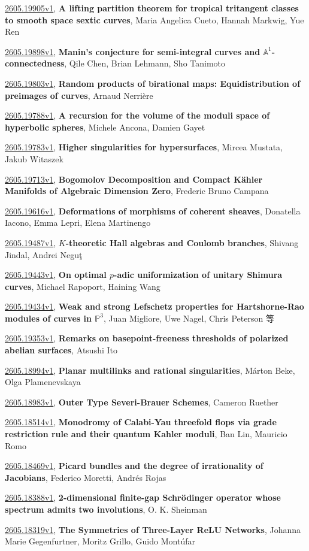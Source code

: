 \documentclass[9pt, a4paper]{article}
\theoremstyle{plain}
\theoremstyle{definition}
\theoremstyle{remark}
\newcommand{\arxiv}[3]{\href{https://arxiv.org/abs/#1}{#1}, \textbf{\textcolor{arxivblue}{#2}}, #3}
\begin{document}
\arxiv{2605.19905v1}{A lifting partition theorem for tropical tritangent classes to smooth space sextic curves}{Maria Angelica Cueto, Hannah Markwig, Yue Ren}

\arxiv{2605.19898v1}{Manin's conjecture for semi-integral curves and $\mathbb A^1$-connectedness}{Qile Chen, Brian Lehmann, Sho Tanimoto}

\arxiv{2605.19803v1}{Random products of birational maps: Equidistribution of preimages of curves}{Arnaud Nerrière}

\arxiv{2605.19788v1}{A recursion for the volume of the moduli space of hyperbolic spheres}{Michele Ancona, Damien Gayet}

\arxiv{2605.19783v1}{Higher singularities for hypersurfaces}{Mircea Mustata, Jakub Witaszek}

\arxiv{2605.19713v1}{Bogomolov Decomposition and Compact K{ä}hler Manifolds of Algebraic Dimension Zero}{Frederic Bruno Campana}

\arxiv{2605.19616v1}{Deformations of morphisms of coherent sheaves}{Donatella Iacono, Emma Lepri, Elena Martinengo}

\arxiv{2605.19487v1}{$K$-theoretic Hall algebras and Coulomb branches}{Shivang Jindal, Andrei Neguţ}

\arxiv{2605.19443v1}{On optimal $p$-adic uniformization of unitary Shimura curves}{Michael Rapoport, Haining Wang}

\arxiv{2605.19434v1}{Weak and strong Lefschetz properties for Hartshorne-Rao modules of curves in $\mathbb P^3$}{Juan Migliore, Uwe Nagel, Chris Peterson 等}

\arxiv{2605.19353v1}{Remarks on basepoint-freeness thresholds of polarized abelian surfaces}{Atsushi Ito}

\arxiv{2605.18994v1}{Planar multilinks and rational singularities}{Márton Beke, Olga Plamenevskaya}

\arxiv{2605.18983v1}{Outer Type Severi-Brauer Schemes}{Cameron Ruether}

\arxiv{2605.18514v1}{Monodromy of Calabi-Yau threefold flops via grade restriction rule and their quantum Kahler moduli}{Ban Lin, Mauricio Romo}

\arxiv{2605.18469v1}{Picard bundles and the degree of irrationality of Jacobians}{Federico Moretti, Andrés Rojas}

\arxiv{2605.18388v1}{2-dimensional finite-gap Schrödinger operator whose spectrum admits two involutions}{O. K. Sheinman}

\arxiv{2605.18319v1}{The Symmetries of Three-Layer ReLU Networks}{Johanna Marie Gegenfurtner, Moritz Grillo, Guido Montúfar}
\end{document}
